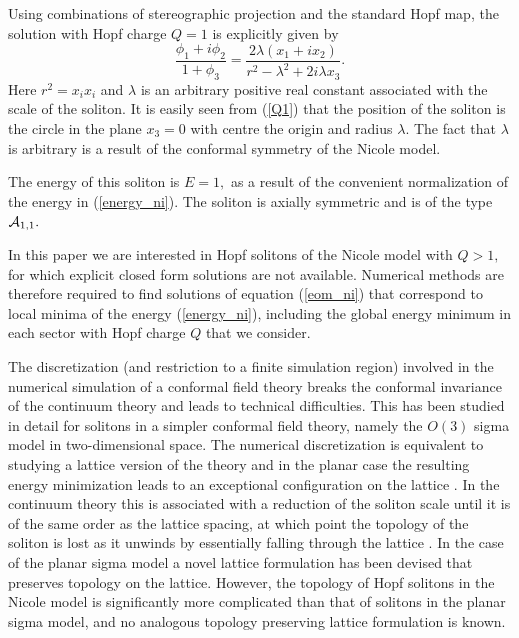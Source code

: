 \documentclass[12pt]{article}
\newcommand{\be}{\begin{equation}}
\newcommand{\ee}{\end{equation}}
\begin{document}
Using combinations of stereographic projection and the standard 
Hopf map, the solution with Hopf charge $Q=1$ is explicitly 
given by \cite{Ni}
\be
\frac{\phi_1+i\phi_2}{1+\phi_3}
=\frac{2\lambda(x_1+ix_2)}{r^2-\lambda^2+2i\lambda x_3}.
\label{Q1}
\ee
Here $r^2=x_ix_i$ and $\lambda$ is an arbitrary positive real constant
associated with the scale of the soliton. It is easily seen from
(\ref{Q1}) that the position of the soliton is the circle in the plane
$x_3=0$ with centre the origin and radius $\lambda.$ The fact that
$\lambda$ is arbitrary is a result of the conformal symmetry of the
Nicole model.

The energy of this soliton is $E=1,$ as a result of the convenient
normalization of the energy in (\ref{energy_ni}). The soliton
is axially symmetric and is of the type ${\cal A}_{1,1}.$

In this paper we are interested in Hopf solitons of the Nicole
model with $Q>1,$ for which explicit closed form solutions are
not available. Numerical methods are therefore required to find
solutions of equation (\ref{eom_ni}) that correspond to
local minima of the energy (\ref{energy_ni}), including the
global energy minimum in each sector with Hopf charge $Q$ that
we consider.

The discretization (and restriction to a finite simulation region)
involved in the numerical simulation of a conformal field theory 
breaks the conformal invariance of the continuum theory and
leads to technical difficulties. This has been studied in detail 
for solitons in a simpler conformal field theory, namely
the $O(3)$ sigma model in two-dimensional space.
The numerical discretization is equivalent to studying a lattice
version of the theory and in the planar case the resulting energy 
minimization leads to an exceptional configuration on the lattice \cite{Lu}.
In the continuum theory this is associated with a reduction of 
the soliton scale until it is of the same order as the lattice spacing,
at which point the topology of the soliton is lost as it unwinds
by essentially falling through the lattice \cite{LPZ}. 
In the case of the planar sigma model a novel lattice formulation
has been devised \cite{Ward} that preserves topology on the lattice.
However, the topology of Hopf solitons in the Nicole model
is significantly more complicated than that of solitons in the planar sigma 
model, and no analogous topology preserving lattice formulation is known.
\end{document}
